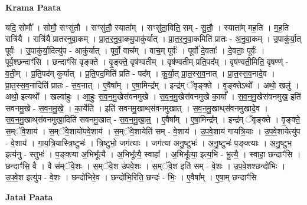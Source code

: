 \documentclass[17pt]{extarticle}
\begin{document}
\textbf{Krama Paata} \newline

यदि॒ सोमौ᳚ । सोमौ॒ सꣳसु॑तौ । सꣳसु॑तौ॒ स्याता᳚म् । सꣳसु॑ता॒विति॒ सम् - सु॒तौ॒ । स्याता᳚म् मह॒ति । म॒ह॒ति रात्रि॑यै । रात्रि॑यै प्रातरनुवा॒कम् । प्रा॒त॒र॒नु॒वा॒कमु॒पाकु॑र्यात् । प्रा॒त॒र॒नु॒वा॒कमिति॑ प्रातः - अ॒नु॒वा॒कम् । उ॒पाकु॑र्या॒त् पूर्वः॑ । उ॒पाकु॑र्या॒दित्यु॑प - आकु॑र्यात् । पूर्वो॒ वाच᳚म् । वाच॒म् पूर्वः॑ । पूर्वो॑ दे॒वताः᳚ । दे॒वताः॒ पूर्वः॑ । पूर्व॒श्छन्दाꣳ॑सि । छन्दाꣳ॑सि वृङ्‍क्ते । वृ॒ङ्‍क्ते॒ वृष॑ण्वतीम् । वृष॑ण्वतीम् प्रति॒पद᳚म् । वृष॑ण्वती॒मिति॒ वृषण्ण्॑ - व॒ती॒म् । प्र॒ति॒पद॑म् कुर्यात् । प्र॒ति॒पद॒मिति॑ प्रति - पद᳚म् । कु॒र्या॒त् प्रा॒त॒स्स॒व॒नात् । प्रा॒त॒स्स॒व॒नादे॒व । प्रा॒त॒स्स॒व॒नादिति॑ प्रातः - स॒व॒नात् । ए॒वैषा᳚म् । ए॒षा॒मिन्द्र᳚म् । इन्द्र॑म् ॅवृङ्‍क्ते । वृ॒ङ्‍क्तेऽथो᳚ । अथो॒ खलु॑ । अथो॒ इत्यथो᳚ । खल्वा॑हुः । आ॒हुः॒ स॒व॒न॒मु॒खेस॑वनमुखे । स॒व॒न॒मु॒खेस॑वनमुखे का॒र्या᳚ । स॒व॒न॒मु॒खेस॑वनमुख॒ इति॑ सवनमु॒खे - स॒व॒न॒मु॒खे॒ । का॒र्येति॑ । इति॑ सवनमु॒खाथ्‌स॑वनमुखात् । स॒व॒न॒मु॒खाथ्‌स॑वनमुखादे॒व । स॒व॒न॒मु॒खाथ्‌स॑वनमुखा॒दिति॑ सवनमु॒खात् - स॒व॒न॒मु॒खा॒त्॒ । ए॒वैषा᳚म् । ए॒षा॒मिन्द्र᳚म् । इन्द्र॑म् ॅवृङ्‍क्ते । वृ॒ङ्‍क्ते॒ स॒म्ॅवे॒शाय॑ । स॒म्ॅवे॒शायो॑पवे॒शाय॑ । स॒म्ॅवे॒शायेति॑ सम् - वे॒शाय॑ । उ॒प॒वे॒शाय॑ गायत्रि॒याः । उ॒प॒वे॒शायेत्यु॑प - वे॒शाय॑ । गा॒य॒त्रि॒यास्त्रि॒ष्टुभः॑ । त्रि॒ष्टुभो॒ जग॑त्याः । जग॑त्या अनु॒ष्टुभः॑ । अ॒नु॒ष्टुभः॑ प॒ङ्‍क्त्याः । अ॒नु॒ष्टुभ॒ इत्य॑नु - स्तुभः॑ । प॒ङ्‍क्त्या अ॒भिभू᳚त्यै । अ॒भिभू᳚त्यै॒ स्वाहा᳚ । अ॒भिभू᳚त्या॒ इत्य॒भि - भू॒त्यै॒ । स्वाहा॒ छन्दाꣳ॑सि । छन्दाꣳ॑सि॒ वै । वै स॑म्ॅवे॒शः । स॒म्ॅवे॒श उ॑पवे॒शः । स॒म्ॅवे॒श इति॑ सम् - वे॒शः । उ॒प॒वे॒शश्छन्दो॑भिः । उ॒प॒वे॒श इत्यु॑प - वे॒शः । छन्दो॑भिरे॒व । छन्दो॑भि॒रिति॒ छन्दः॑ - भिः॒ । ए॒वैषा᳚म् । ए॒षा॒म् छन्दाꣳ॑सि \newline

\textbf{Jatai Paata} \newline
\end{document}
